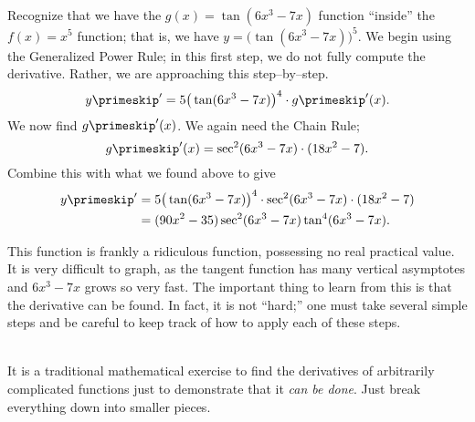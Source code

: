 {Recognize that we have the $g(x)=\tan(6x^3-7x)$ function ``inside'' the $f(x)=x^5$ function; that is, we have $y = \big(\tan(6x^3-7x)\big)^5$. We begin using the Generalized Power Rule; in this first step, we do not fully compute the derivative. Rather, we are approaching this step--by--step.
\[
y\primeskip' = 5\big(\tan(6x^3-7x)\big)^4\cdot g\primeskip'(x).
\]
We now find $g\primeskip'(x)$. We again need the Chain Rule; 
\[
g\primeskip'(x) = \sec^2(6x^3-7x)\cdot(18x^2-7).
\]
Combine this with what we found above to give
\begin{align*}
y\primeskip' &= 5\big(\tan(6x^3-7x)\big)^4\cdot\sec^2(6x^3-7x)\cdot(18x^2-7)\\ 
&= (90x^2-35)\sec^2(6x^3-7x)\tan^4(6x^3-7x).
\end{align*}

This function is frankly a ridiculous function, possessing no real practical value. It is very difficult to graph, as the tangent function has many vertical asymptotes and $6x^3-7x$ grows so very fast. The important thing to learn from this is that the derivative can be found. In fact, it is not ``hard;'' one must take several simple steps and be careful to keep track of how to apply each of these steps.%
}\\

It is a traditional mathematical exercise to find the derivatives of arbitrarily complicated functions just to demonstrate that it \textit{can be done}. Just break everything down into smaller pieces. \\


